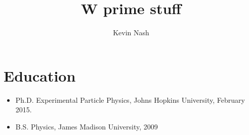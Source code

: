 \documentclass[12pt,oneside,final]{thesis}
\begin{document}
\title{W prime stuff}
\author{Kevin Nash}
\dissertation
\doctorphilosophy
\copyrightnotice












%









%

%









\section*{Education}

\begin{itemize}
  \item Ph.D. Experimental Particle Physics, Johns Hopkins University, February 2015.
  \item B.S. Physics, James Madison University, 2009
\end{itemize}

\end{document}
